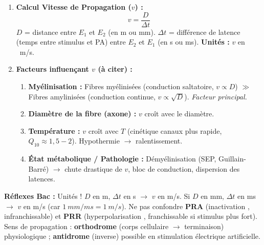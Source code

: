 \documentclass[11pt]{article}
\begin{document}
\begin{methode}
\begin{enumerate}
    \item \textbf{Calcul Vitesse de Propagation ($v$) :}
    \[ v = \frac{D}{\Delta t} \]
    $D$ = distance entre $E_1$ et $E_2$ (en m ou mm). $\Delta t$ = différence de latence (temps entre stimulus et PA) entre $E_2$ et $E_1$ (en s ou ms).
    \textbf{Unités :} $v$ en \SI{}{m/s}.
    \item \textbf{Facteurs influençant $v$ (à citer) :}
    \begin{enumerate}
        \item \textbf{Myélinisation :} Fibres myélinisées (conduction saltatoire, $v \propto D$) $\gg$ Fibres amylinisées (conduction continue, $v \propto \sqrt{D}$). \textit{Facteur principal.}
        \item \textbf{Diamètre de la fibre (axone) :} $v$ croît avec le diamètre.
        \item \textbf{Température :} $v$ croît avec $T$ (cinétique canaux plus rapide, $Q_{10} \approx 1,5-2$). Hypothermie $\rightarrow$ ralentissement.
        \item \textbf{État métabolique / Pathologie :} Démyélinisation (SEP, Guillain-Barré) $\rightarrow$ chute drastique de $v$, bloc de conduction, dispersion des latences.
    \end{enumerate}
\end{enumerate}

\textbf{Réflexes Bac :} Unités ! $D$ en m, $\Delta t$ en s $\rightarrow$ $v$ en m/s. Si $D$ en mm, $\Delta t$ en ms $\rightarrow$ $v$ en m/s (car $1\ mm/ms = 1\ m/s$). Ne pas confondre \textbf{PRA} (inactivation , infranchissable) et \textbf{PRR} (hyperpolarisation , franchissable si stimulus plus fort). Sens de propagation : \textbf{orthodrome} (corps cellulaire $\rightarrow$ terminaison) physiologique ; \textbf{antidrome} (inverse) possible en stimulation électrique artificielle.
\end{methode}
\end{document}
